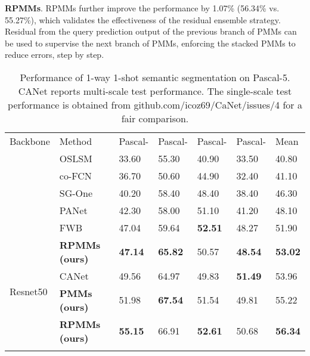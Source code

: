 \documentclass[runningheads]{llncs}
\begin{document}
\textbf{RPMMs}. RPMMs further improve the performance by 1.07\% (56.34\% vs. 55.27\%), which validates the effectiveness of the residual ensemble strategy. Residual from the query prediction output of the previous branch of PMMs can be used to supervise the next branch of PMMs, enforcing the stacked PMMs to reduce errors, step by step. 


\setlength{\tabcolsep}{4pt}
\begin{table}[t]
\begin{center}
\caption{Performance of 1-way 1-shot semantic segmentation on Pascal-5. CANet reports multi-scale test performance. The single-scale test performance is obtained from github.com/icoz69/CaNet/issues/4 for a fair comparison.}
\label{table:1shot}
\begin{tabular}{lllllll}
\hline\noalign{\smallskip}
Backbone & Method & Pascal- & Pascal- & Pascal- & Pascal- & Mean \\
\noalign{\smallskip}
\hline
\noalign{\smallskip}
\multirow{5}{*}{VGG16} & OSLSM~\cite{OSLSM} & 33.60 & 55.30 & 40.90 & 33.50 & 40.80 \\
  & co-FCN~\cite{co-FCN}                    & 36.70 & 50.60 & 44.90 &32.40 & 41.10\\
  & SG-One~\cite{SG-One}                    & 40.20 & 58.40 & 48.40 &38.40 & 46.30\\
  & PANet~\cite{PANet}                      & 42.30 & 58.00 & 51.10 &41.20 & 48.10\\
  & FWB~\cite{FWB-ICCV2019}                 & 47.04 & 59.64 & {\bf 52.51} & 48.27 & 51.90\\
& \bf RPMMs (ours)                       & \bf 47.14& \bf 65.82 & 50.57 &\bf 48.54 & \bf53.02\\
\hline
\multirow{2}{*}{Resnet50} & CANet~\cite{CaNet}  & 49.56 & 64.97 & 49.83 & {\bf51.49} & 53.96 \\
  & {\bf  PMMs (ours)}                         & 51.98 & \bf 67.54 & 51.54 & 49.81 & 55.22\\
  & {\bf RPMMs (ours)}                         & \bf 55.15 & 66.91 & \bf 52.61 & 50.68 & {\bf 56.34}\\
\hline
\vspace{-0.2cm}
\end{tabular}
\end{center}
\end{table}
\setlength{\tabcolsep}{1.4pt}
\end{document}
